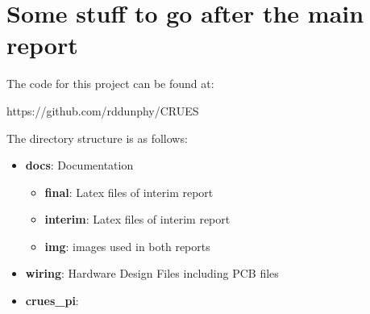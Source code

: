 
\chapter{Some stuff to go after the main report}\label{appendix/a}

The code for this project can be found at:
\begin{center}
https://github.com/rddunphy/CRUES
\end{center}

The directory structure is as follows: 

\begin{itemize}
	\item[] \textbf{docs}: Documentation
		\begin{itemize}
			\item[] \textbf{final}: Latex files of interim report
			\item[] \textbf{interim}: Latex files of interim report
			\item[] \textbf{img}: images used in both reports
		\end{itemize}
	\item[] \textbf{wiring}: Hardware Design Files including PCB files
	\item[] \textbf{crues\_pi}: 
\end{itemize}